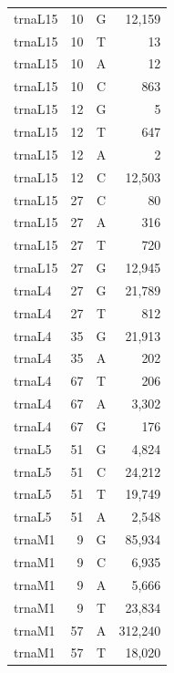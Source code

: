 \documentclass[12pt]{rockefeller}
\begin{document}
\begin{tiny}
\begin{longtable}{|l|r|c|r|}
 trnaL15 &        10 &          G &     12,159 \\
 trnaL15 &        10 &          T &         13 \\
 trnaL15 &        10 &          A &         12 \\
 trnaL15 &        10 &          C &        863 \\
 trnaL15 &        12 &          G &          5 \\
 trnaL15 &        12 &          T &        647 \\
 trnaL15 &        12 &          A &          2 \\
 trnaL15 &        12 &          C &     12,503 \\
 trnaL15 &        27 &          C &         80 \\
 trnaL15 &        27 &          A &        316 \\
 trnaL15 &        27 &          T &        720 \\
 trnaL15 &        27 &          G &     12,945 \\
  trnaL4 &        27 &          G &     21,789 \\
  trnaL4 &        27 &          T &        812 \\
  trnaL4 &        35 &          G &     21,913 \\
  trnaL4 &        35 &          A &        202 \\
  trnaL4 &        67 &          T &        206 \\
  trnaL4 &        67 &          A &      3,302 \\
  trnaL4 &        67 &          G &        176 \\
  trnaL5 &        51 &          G &      4,824 \\
  trnaL5 &        51 &          C &     24,212 \\
  trnaL5 &        51 &          T &     19,749 \\
  trnaL5 &        51 &          A &      2,548 \\
  trnaM1 &         9 &          G &     85,934 \\
  trnaM1 &         9 &          C &      6,935 \\
  trnaM1 &         9 &          A &      5,666 \\
  trnaM1 &         9 &          T &     23,834 \\
  trnaM1 &        57 &          A &    312,240 \\
  trnaM1 &        57 &          T &     18,020 \\

\end{longtable}
\end{tiny}
\end{document}
